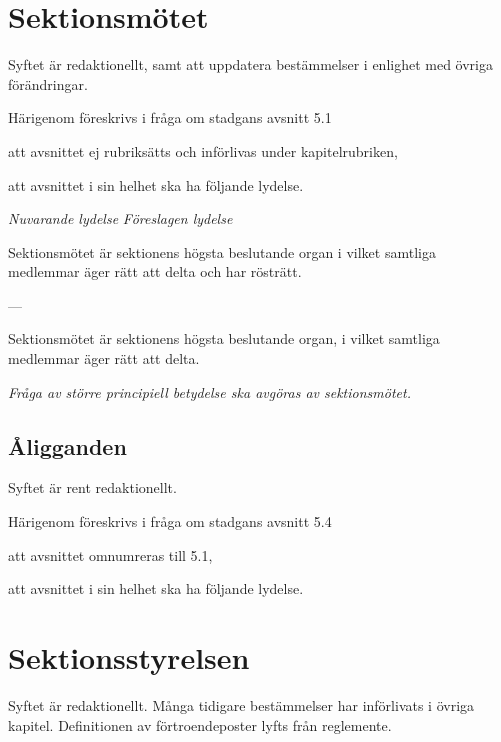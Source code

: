 \documentclass{article}
\newenvironment{lydelse}
    {\begin{paracol}{2}%
        \emph{Nuvarande lydelse}%
        \switchcolumn%
        \emph{Föreslagen lydelse}%
    \end{paracol}%
    \begin{enumerate}[label=\thesubsection.\arabic*]%
    \begin{paracol}{2}%
    }{\end{paracol}\end{enumerate}}
\begin{document}
\section{Sektionsmötet}
Syftet är redaktionellt, samt att uppdatera bestämmelser i enlighet med övriga förändringar.

Härigenom föreskrivs i fråga om stadgans avsnitt 5.1
\begin{dels}
    \item att avsnittet ej rubriksätts och införlivas under kapitelrubriken,
    \item att avsnittet i sin helhet ska ha följande lydelse.
\end{dels}

\begin{lydelse}
  \setcounter{subsection}{1}
    \item Sektionsmötet är sektionens högsta beslutande organ i vilket samtliga medlemmar äger rätt att delta och har rösträtt.

    \item[] ---
  \switchcolumn
  \setcounter{subsection}{0}
  \setcounter{enumi}{0}
    \item Sektionsmötet är sektionens högsta beslutande organ, i vilket samtliga medlemmar äger rätt att delta.

    \item \emph{Fråga av större principiell betydelse ska avgöras av sektionsmötet.}

\end{lydelse}

\setcounter{subsection}{0}
\subsection{Åligganden}
Syftet är rent redaktionellt.

Härigenom föreskrivs i fråga om stadgans avsnitt 5.4
\begin{dels}
    \item att avsnittet omnumreras till 5.1,
    \item att avsnittet i sin helhet ska ha följande lydelse.
\end{dels}



\section{Sektionsstyrelsen}
Syftet är redaktionellt.
Många tidigare bestämmelser har införlivats i övriga kapitel.
Definitionen av förtroendeposter lyfts från reglemente.
\end{document}
